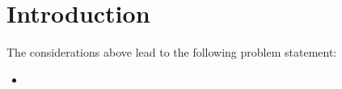 \chapter{Introduction}
\label{introduction}


The considerations above lead to the following problem statement:
\begin{itemize}
\item \textit{}
\end{itemize} 
